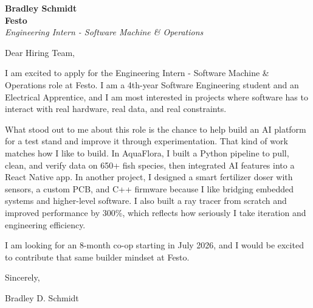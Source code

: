 \documentclass[11pt]{article}
\begin{document}
\textbf{Bradley Schmidt}\\
\vspace{0.5em}
\textbf{Festo}\\
\textit{Engineering Intern - Software Machine \& Operations}

Dear Hiring Team,

\par

I am excited to apply for the Engineering Intern - Software Machine \& Operations role at Festo. I am a 4th-year Software Engineering student and an Electrical Apprentice, and I am most interested in projects where software has to interact with real hardware, real data, and real constraints.

\par

What stood out to me about this role is the chance to help build an AI platform for a test stand and improve it through experimentation. That kind of work matches how I like to build. In AquaFlora, I built a Python pipeline to pull, clean, and verify data on 650+ fish species, then integrated AI features into a React Native app. In another project, I designed a smart fertilizer doser with sensors, a custom PCB, and C++ firmware because I like bridging embedded systems and higher-level software. I also built a ray tracer from scratch and improved performance by 300\%, which reflects how seriously I take iteration and engineering efficiency.

\par

I am looking for an 8-month co-op starting in July 2026, and I would be excited to contribute that same builder mindset at Festo.

\par

Sincerely,

\par

Bradley D. Schmidt
\end{document}
